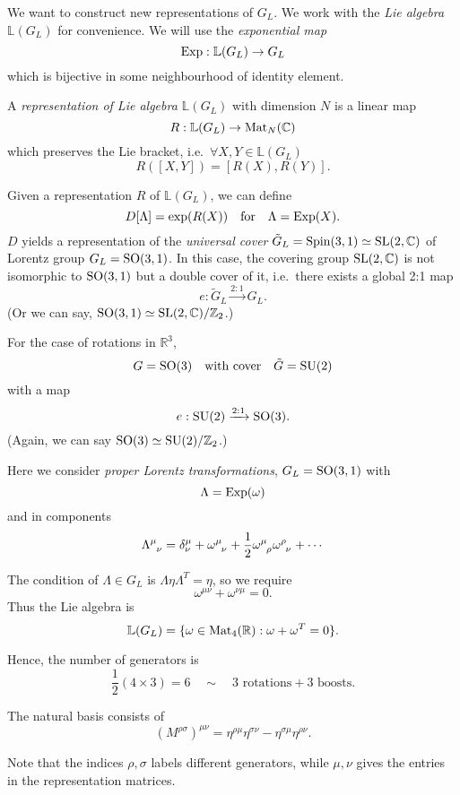 \documentclass[a4paper,11pt]{article}
\begin{document}
	We want to construct new representations of $G_L$. We work with the \emph{Lie algebra} $\mathbb{L}(G_L)$ for convenience. We will use the \emph{exponential map}
	\[
		\operatorname{Exp} : \mathbb{L}(G_L) \to G_L
	\]
	which is bijective in some neighbourhood of identity element.

	\begin{defi}
		A \emph{representation of Lie algebra $\mathbb{L}(G_L)$} with dimension $N$ is a linear map 
		\[
			R : \mathbb{L}(G_L) \to \operatorname{Mat}_N(\mathbb{C})
		\]
		which preserves the Lie bracket, i.e.\ $\forall X,Y \in \mathbb{L}(G_L)$ 
		\[
			R([X,Y]) = [R(X), R(Y)].
		\]
	\end{defi}
	
	Given a representation $R$ of $\mathbb{L}(G_L)$, we can define
	\[
		D[\Lambda] = \exp(R(X)) \quad \text{for} \quad \Lambda = \operatorname{Exp}(X).
	\]
	$D$ yields a representation of the \emph{universal cover} $\tilde G_L = \text{Spin}(3,1) \simeq \operatorname{SL}(2, \mathbb{C})$ of Lorentz group $G_L = \operatorname{SO}(3,1)$. In this case, the covering group $\operatorname{SL}(2,\mathbb{C})$ is not isomorphic to $\operatorname{SO}(3,1)$ but a double cover of it, i.e.\ there exists a global 2:1 map
	\[
		e : \tilde G_L \xrightarrow{2:1} G_L.
	\]
	(Or we can say, $\operatorname{SO}(3,1) \simeq \operatorname{SL}(2,\mathbb{C})/\mathbb{Z}_2$.)

	For the case of rotations in $\mathbb{R}^3$, 
	\[
		G = \operatorname{SO}(3) \quad \text{with cover} \quad \tilde G = \operatorname{SU}(2)
	\]
	with a map
	\[
		e : \operatorname{SU}(2) \xrightarrow{2:1} \operatorname{SO}(3).
	\]
	(Again, we can say $\operatorname{SO}(3) \simeq \operatorname{SU}(2)/\mathbb{Z}_2$.)

	Here we consider \emph{proper Lorentz transformations}, $G_L = \operatorname{SO}(3,1)$ with
	\[
		\Lambda = \operatorname{Exp}(\omega)
	\]
	and in components 
	\[
		\LT{\mu}{\nu} = \delta^\mu_\nu + \omega\indices{^\mu_\nu} + \frac{1}{2} \omega\indices{^\mu_\rho} \omega\indices{^\rho_\nu} + \cdots 
	\]
	
	The condition of $\Lambda \in G_L$ is $\Lambda \eta \Lambda^T = \eta$, so we require 
	\[
		\omega ^{\mu \nu} + \omega ^{\nu \mu} = 0.
	\]
	Thus the Lie algebra is
	\[
		\mathbb{L}(G_L) = \{\omega \in \operatorname{Mat}_4(\mathbb{R}) : \omega + \omega^T = 0\}.
	\]

	Hence, the number of generators is 
	\[
		\frac{1}{2} (4 \times 3) = 6 \quad \sim \quad \text{3 rotations} + \text{3 boosts}.
	\]
	
	The natural basis consists of 
	\[
		(M ^{\rho \sigma})^{\mu \nu} = \eta ^{\rho \mu} \eta ^{\sigma \nu} - \eta ^{\sigma \mu} \eta ^{\rho \nu}.
	\]

	Note that the indices $\rho,\sigma$ labels different generators, while $\mu,\nu$ gives the entries in the representation matrices.
\end{document}
